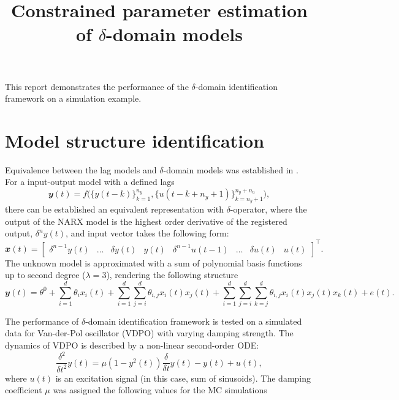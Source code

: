\documentclass[a4paper,11pt,twoside]{article}
\title{Constrained parameter estimation of $\delta$-domain models}
\def\order{3}
\theoremstyle{mytheoremstyle}
\begin{document}
	\maketitle
\par This report demonstrates the performance of the $\delta$-domain identification framework on a simulation example.
\section{Model structure identification}
\par Equivalence between the lag models and $\delta$-domain models was established in \cite{ANDERSON20071859}. For a input-output model with a defined lags
\begin{equation}
	\mathbfit{y}(t) = f\big( \{y(t - k)\}^{n_y}_{k=1}, \{u(t - k + n_y + 1)\}^{n_y + n_u}_{k= n_y + 1} \big),
\end{equation}
there can be established an equivalent representation with $\delta$-operator, where the output of the NARX model is the highest order derivative of the registered output, $\delta^{n} y(t)$, and input vector takes the following form:
\begin{equation}
\mathbfit{x}(t) = \left[\begin{array}{cccccccc}
\delta^{n-1} y(t) & \dots & \delta y(t) & y(t) & \delta^{n-1}u(t-1) & \dots  & \delta u(t) & u(t)
\end{array}\right]^{\top}.
\end{equation}
The unknown model is approximated with a sum of polynomial basis functions up to second degree ($\lambda = \order$), rendering the following structure
\begin{equation}\label{eq:narx}
	\mathbfit{y}(t) = \theta^0 + \sum_{i=1}^{d} \theta_i x_i(t) + \sum_{i=1}^{d} \sum_{j=i}^{d} \theta_{i,j} x_i(t) x_j(t) +  \sum_{i=1}^{d} \sum_{j=i}^{d} \sum_{k=j}^{d} \theta_{i,j} x_i(t) x_j(t) x_k(t) + e(t).
\end{equation}
\par The performance of $\delta$-domain identification framework is tested on a simulated data for Van-der-Pol oscillator (VDPO) with varying damping strength. The dynamics of VDPO is described by a non-linear second-order ODE:
\begin{equation}
\frac{\delta^2}{\delta t^2} y(t) = \mu(1 - y^2(t))\frac{\delta}{\delta t} y(t) - y(t) + u(t),
\end{equation} 
where $u(t)$ is an excitation signal (in this case, sum of sinusoids). The damping coefficient $\mu$ was assigned the following values for the MC simulations
\end{document}
